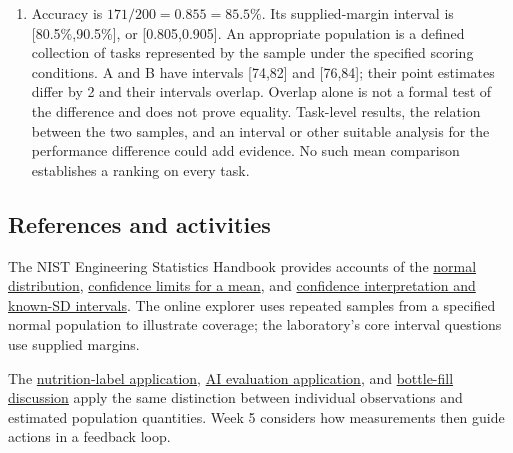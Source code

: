 \documentclass[11pt,letterpaper]{article}
\begin{document}
{\begin{enumerate}
\item Accuracy is $171/200=0.855=85.5\%$. Its supplied-margin interval is [80.5\%,90.5\%], or [0.805,0.905]. An appropriate population is a defined collection of tasks represented by the sample under the specified scoring conditions. A and B have intervals [74,82] and [76,84]; their point estimates differ by 2 and their intervals overlap. Overlap alone is not a formal test of the difference and does not prove equality. Task-level results, the relation between the two samples, and an interval or other suitable analysis for the performance difference could add evidence. No such mean comparison establishes a ranking on every task.
\end{enumerate}
\subsection*{References and activities}
The NIST Engineering Statistics Handbook provides accounts of the \href{https://www.itl.nist.gov/div898/handbook/eda/section3/eda3661.htm}{normal distribution}, \href{https://www.itl.nist.gov/div898/handbook/eda/section3/eda352.htm}{confidence limits for a mean}, and \href{https://www.itl.nist.gov/div898/handbook/prc/section1/prc14.htm}{confidence interpretation and known-SD intervals}. The online explorer uses repeated samples from a specified normal population to illustrate coverage; the laboratory's core interval questions use supplied margins.

The \href{https://bobovski66.github.io/MathInSociety/applications/week4_application.html}{nutrition-label application}, \href{https://bobovski66.github.io/MathInSociety/applications/week4_ai.html}{AI evaluation application}, and \href{https://bobovski66.github.io/MathInSociety/discussions/week4_discussion.html}{bottle-fill discussion} apply the same distinction between individual observations and estimated population quantities. Week 5 considers how measurements then guide actions in a feedback loop.
}
\end{document}
